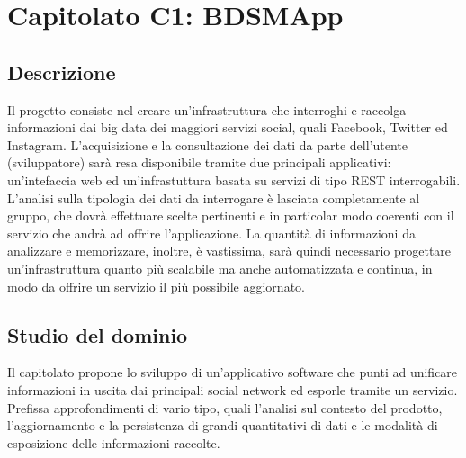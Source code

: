%


\section{Capitolato C1: BDSMApp}

\subsection{Descrizione}
Il progetto consiste nel creare un'infrastruttura che interroghi e raccolga informazioni dai big data\gloss{} dei maggiori servizi social, quali Facebook, Twitter ed Instagram. L'acquisizione e la consultazione dei dati da parte dell'utente (sviluppatore) sarà resa disponibile tramite due principali applicativi: un'intefaccia web ed un'infrastuttura basata su servizi di tipo REST\gloss{} interrogabili. L'analisi sulla tipologia dei dati da interrogare è lasciata completamente al gruppo, che dovrà effettuare scelte pertinenti e  in particolar modo coerenti con il servizio che andrà ad offrire l'applicazione. La quantità di informazioni da analizzare e memorizzare, inoltre, è vastissima, sarà quindi necessario progettare un'infrastruttura quanto più scalabile ma anche automatizzata e continua, in modo da offrire un servizio il più possibile aggiornato.

\subsection{Studio del dominio}
Il capitolato propone lo sviluppo di un'applicativo software che punti ad unificare informazioni in uscita dai principali social network ed esporle tramite un servizio. Prefissa approfondimenti di vario tipo, quali l'analisi sul contesto del prodotto, l'aggiornamento e la persistenza di grandi quantitativi di dati e le modalità di esposizione delle informazioni raccolte.

